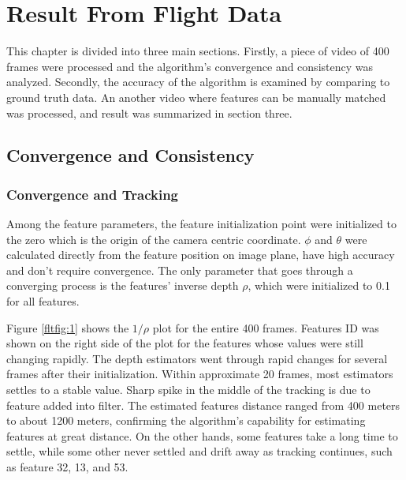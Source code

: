 \chapter{Result From Flight Data}\label{ch:FlightResult}

This chapter is divided into three main sections. Firstly, a piece of
video of 400 frames were processed and the algorithm's convergence and
consistency was analyzed. Secondly, the accuracy of the algorithm is
examined by comparing to ground truth data. An another video where
features can be manually matched was processed, and result was
summarized in section three.

\section{Convergence and Consistency}

\subsection{Convergence and Tracking}
Among the feature parameters, the feature initialization point were
initialized to the zero which is the origin of the camera centric
coordinate. $\phi$ and $\theta$ were calculated directly from the
feature position on image plane, have high accuracy and don't require
convergence. The only parameter that goes through a converging process
is the features' inverse depth $\rho$, which were initialized to 0.1
for all features. 

Figure \ref{fltfig:1} shows the $1/\rho$ plot for the entire 400
frames. Features ID was shown on the right side of the plot for the
features whose values were still changing rapidly. The depth
estimators went through rapid changes for several frames after their
initialization. Within approximate 20 frames, most estimators settles
to a stable value. Sharp spike in the middle of the tracking is due to
feature added into filter. The estimated features distance ranged from
400 meters to about 1200 meters, confirming the algorithm's capability
for estimating features at great distance. On the other hands, some
features take a long time to settle, while some other never settled
and drift away as tracking continues, such as feature 32, 13, and 53.

